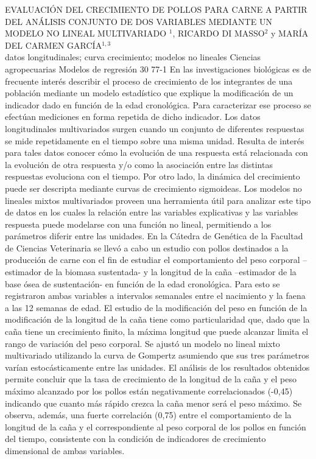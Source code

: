 \A
{EVALUACIÓN DEL CRECIMIENTO DE POLLOS PARA CARNE A PARTIR DEL ANÁLISIS CONJUNTO DE DOS VARIABLES MEDIANTE UN MODELO NO LINEAL MULTIVARIADO}
{$^1$, RICARDO DI MASSO$^2$ y MARÍA DEL CARMEN GARCÍA$^{1,3}$}
{
\\}
{datos longitudinales; curva crecimiento; modelos no lineales} 
 {Ciencias agropecuarias} 
 {Modelos de regresión} 
 {30} 
 {77-1}
{En las investigaciones biológicas es de frecuente interés describir el proceso de crecimiento de los integrantes de una población mediante un modelo estadístico que explique la modificación de un indicador dado en función de la edad cronológica. Para caracterizar ese proceso se efectúan mediciones en forma repetida de dicho indicador. Los datos longitudinales multivariados surgen cuando un conjunto de diferentes respuestas se mide repetidamente en el tiempo sobre una misma unidad. Resulta de interés para tales datos conocer cómo la evolución de una respuesta está relacionada con la evolución de otra respuesta y/o como la asociación entre las distintas respuestas evoluciona con el tiempo. Por otro lado, la dinámica del crecimiento puede ser descripta mediante curvas de crecimiento sigmoideas. Los modelos no lineales mixtos multivariados proveen una herramienta útil para analizar este tipo de datos en los cuales la relación entre las variables explicativas y las variables respuesta puede modelarse con una función no lineal, permitiendo a los parámetros diferir entre las unidades. En la Cátedra de Genética de la Facultad de Ciencias Veterinaria se llevó a cabo un estudio con pollos destinados a la producción de carne con el fin de estudiar el comportamiento del peso corporal –estimador de la biomasa sustentada- y la longitud de la caña –estimador de la base ósea de sustentación- en función de la edad cronológica. Para esto se registraron ambas variables a intervalos semanales entre el nacimiento y la faena a las 12 semanas de edad. El estudio de la modificación del peso en función de la modificación de la longitud de la caña tiene como particularidad que, dado que la caña tiene un crecimiento finito, la máxima longitud que puede alcanzar limita el rango de variación del peso corporal. Se ajustó un modelo no lineal mixto multivariado utilizando la curva de Gompertz asumiendo que sus tres parámetros varían estocásticamente entre las unidades. El análisis de los resultados obtenidos permite concluir que la tasa de crecimiento de la longitud de la caña y el peso máximo alcanzado por los pollos están negativamente correlacionados (-0,45) indicando que cuanto más rápido crezca la caña menor será el peso máximo. Se observa, además, una fuerte correlación (0,75) entre el comportamiento de la longitud de la caña y el correspondiente al peso corporal de los pollos en función del tiempo, consistente con la condición de indicadores de crecimiento dimensional de ambas variables.}
